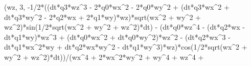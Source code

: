 \documentclass[]{article}
\newenvironment{Shaded}{}{}
\newcommand{\DecValTok}[1]{\textcolor[rgb]{0.25,0.63,0.44}{#1}}
\newcommand{\OperatorTok}[1]{\textcolor[rgb]{0.40,0.40,0.40}{#1}}
\newcommand{\NormalTok}[1]{#1}
\begin{document}
\begin{Shaded}
\begin{Highlighting}[]
\NormalTok{(wz, }\DecValTok{3}\NormalTok{, }\OperatorTok{-}\DecValTok{1}\OperatorTok{/}\DecValTok{2}\OperatorTok{*}\NormalTok{((dt}\OperatorTok{*}\NormalTok{q3}\OperatorTok{*}\NormalTok{wz}\OperatorTok{^}\DecValTok{3} \OperatorTok{-} \DecValTok{2}\OperatorTok{*}\NormalTok{q0}\OperatorTok{*}\NormalTok{wx}\OperatorTok{^}\DecValTok{2} \OperatorTok{-} \DecValTok{2}\OperatorTok{*}\NormalTok{q0}\OperatorTok{*}\NormalTok{wy}\OperatorTok{^}\DecValTok{2} \OperatorTok{+}\NormalTok{ (dt}\OperatorTok{*}\NormalTok{q3}\OperatorTok{*}\NormalTok{wx}\OperatorTok{^}\DecValTok{2} \OperatorTok{+}\NormalTok{ dt}\OperatorTok{*}\NormalTok{q3}\OperatorTok{*}\NormalTok{wy}\OperatorTok{^}\DecValTok{2} \OperatorTok{-} \DecValTok{2}\OperatorTok{*}\NormalTok{q2}\OperatorTok{*}\NormalTok{wx }\OperatorTok{+} \DecValTok{2}\OperatorTok{*}\NormalTok{q1}\OperatorTok{*}\NormalTok{wy)}\OperatorTok{*}\NormalTok{wz)}\OperatorTok{*}\NormalTok{sqrt(wx}\OperatorTok{^}\DecValTok{2} \OperatorTok{+}\NormalTok{ wy}\OperatorTok{^}\DecValTok{2} \OperatorTok{+}\NormalTok{ wz}\OperatorTok{^}\DecValTok{2}\NormalTok{)}\OperatorTok{*}\NormalTok{sin(}\DecValTok{1}\OperatorTok{/}\DecValTok{2}\OperatorTok{*}\NormalTok{sqrt(wx}\OperatorTok{^}\DecValTok{2} \OperatorTok{+}\NormalTok{ wy}\OperatorTok{^}\DecValTok{2} \OperatorTok{+}\NormalTok{ wz}\OperatorTok{^}\DecValTok{2}\NormalTok{)}\OperatorTok{*}\NormalTok{dt) }\OperatorTok{-}\NormalTok{ (dt}\OperatorTok{*}\NormalTok{q0}\OperatorTok{*}\NormalTok{wz}\OperatorTok{^}\DecValTok{4} \OperatorTok{-}\NormalTok{ (dt}\OperatorTok{*}\NormalTok{q2}\OperatorTok{*}\NormalTok{wx }\OperatorTok{-}\NormalTok{ dt}\OperatorTok{*}\NormalTok{q1}\OperatorTok{*}\NormalTok{wy)}\OperatorTok{*}\NormalTok{wz}\OperatorTok{^}\DecValTok{3} \OperatorTok{+}\NormalTok{ (dt}\OperatorTok{*}\NormalTok{q0}\OperatorTok{*}\NormalTok{wx}\OperatorTok{^}\DecValTok{2} \OperatorTok{+}\NormalTok{ dt}\OperatorTok{*}\NormalTok{q0}\OperatorTok{*}\NormalTok{wy}\OperatorTok{^}\DecValTok{2}\NormalTok{)}\OperatorTok{*}\NormalTok{wz}\OperatorTok{^}\DecValTok{2} \OperatorTok{-}\NormalTok{ (dt}\OperatorTok{*}\NormalTok{q2}\OperatorTok{*}\NormalTok{wx}\OperatorTok{^}\DecValTok{3} \OperatorTok{-}\NormalTok{ dt}\OperatorTok{*}\NormalTok{q1}\OperatorTok{*}\NormalTok{wx}\OperatorTok{^}\DecValTok{2}\OperatorTok{*}\NormalTok{wy }\OperatorTok{+}\NormalTok{ dt}\OperatorTok{*}\NormalTok{q2}\OperatorTok{*}\NormalTok{wx}\OperatorTok{*}\NormalTok{wy}\OperatorTok{^}\DecValTok{2} \OperatorTok{-}\NormalTok{ dt}\OperatorTok{*}\NormalTok{q1}\OperatorTok{*}\NormalTok{wy}\OperatorTok{^}\DecValTok{3}\NormalTok{)}\OperatorTok{*}\NormalTok{wz)}\OperatorTok{*}\NormalTok{cos(}\DecValTok{1}\OperatorTok{/}\DecValTok{2}\OperatorTok{*}\NormalTok{sqrt(wx}\OperatorTok{^}\DecValTok{2} \OperatorTok{+}\NormalTok{ wy}\OperatorTok{^}\DecValTok{2} \OperatorTok{+}\NormalTok{ wz}\OperatorTok{^}\DecValTok{2}\NormalTok{)}\OperatorTok{*}\NormalTok{dt))}\OperatorTok{/}\NormalTok{(wx}\OperatorTok{^}\DecValTok{4} \OperatorTok{+} \DecValTok{2}\OperatorTok{*}\NormalTok{wx}\OperatorTok{^}\DecValTok{2}\OperatorTok{*}\NormalTok{wy}\OperatorTok{^}\DecValTok{2} \OperatorTok{+}\NormalTok{ wy}\OperatorTok{^}\DecValTok{4} \OperatorTok{+}\NormalTok{ wz}\OperatorTok{^}\DecValTok{4} \OperatorTok{+} 
\end{Highlighting}
\end{Shaded}
\end{document}
